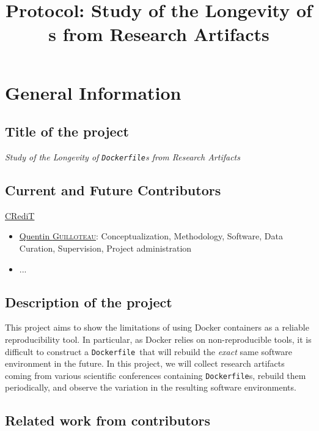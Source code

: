 \documentclass{article}
\title{Protocol: Study of the Longevity of \dfile s from Research Artifacts}
\newcommand{\dfile}{\texttt{Dockerfile}}
\begin{document}
\maketitle

\section{General Information}

\subsection{Title of the project}

\emph{Study of the Longevity of \dfile s from Research Artifacts}

\subsection{Current and Future Contributors}

\href{https://www.elsevier.com/researcher/author/policies-and-guidelines/credit-author-statement}{CRediT}

\begin{itemize}
  \item \href{https://orcid.org/0009-0003-7645-5044}{Quentin \textsc{Guilloteau}}: Conceptualization, Methodology, Software, Data Curation, Supervision, Project administration
  \item ...
\end{itemize}


\subsection{Description of the project}

This project aims to show the limitations of using Docker containers as a reliable reproducibility tool.
In particular, as Docker relies on non-reproducible tools, it is difficult to construct a \dfile\ that will rebuild the \emph{exact} same software environment in the future.
In this project, we will collect research artifacts coming from various scientific conferences containing \dfile s, rebuild them periodically, and observe the variation in the resulting software environments.

\subsection{Related work from contributors}
\end{document}
